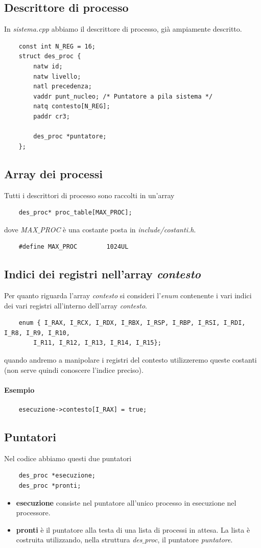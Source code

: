 \subsection{Descrittore di processo}
In \emph{sistema.cpp} abbiamo il descrittore di processo, già ampiamente descritto. 
\small 
\begin{verbatim}	
	const int N_REG = 16;
	struct des_proc {
		natw id;
		natw livello;
		natl precedenza;
		vaddr punt_nucleo; /* Puntatore a pila sistema */
		natq contesto[N_REG];
		paddr cr3;
		
		des_proc *puntatore;
	};
\end{verbatim}
\normalsize 
\subsection{Array dei processi}Tutti i descrittori di processo sono raccolti in un'array
\begin{verbatim}
	des_proc* proc_table[MAX_PROC];
\end{verbatim}
dove \emph{MAX$\_$PROC} è una costante posta in \emph{include/costanti.h}. 
\begin{verbatim}
	#define MAX_PROC        1024UL
\end{verbatim}
\subsection{Indici dei registri nell'array \emph{contesto}} Per quanto riguarda l'array \emph{contesto} si consideri l'\emph{enum} contenente i vari indici dei vari registri all'interno dell'array \emph{contesto}.
\begin{verbatim}
	enum { I_RAX, I_RCX, I_RDX, I_RBX, I_RSP, I_RBP, I_RSI, I_RDI, I_R8, I_R9, I_R10, 
		I_R11, I_R12, I_R13, I_R14, I_R15};
\end{verbatim}
quando andremo a manipolare i registri del contesto utilizzeremo queste costanti (non serve quindi conoscere l'indice preciso). \paragraph{Esempio}
\begin{verbatim}
	esecuzione->contesto[I_RAX] = true;
\end{verbatim}

\subsection{Puntatori}
Nel codice abbiamo questi due puntatori
\begin{verbatim}
	des_proc *esecuzione; 
	des_proc *pronti;
\end{verbatim}
\begin{itemize}
	\item \textbf{esecuzione} consiste nel puntatore all'unico processo in esecuzione nel processore.
	\item \textbf{pronti} è il puntatore alla testa di una lista di processi in attesa. La lista è costruita utilizzando, nella struttura \emph{des$\_$proc}, il puntatore \emph{puntatore}.
\end{itemize}

